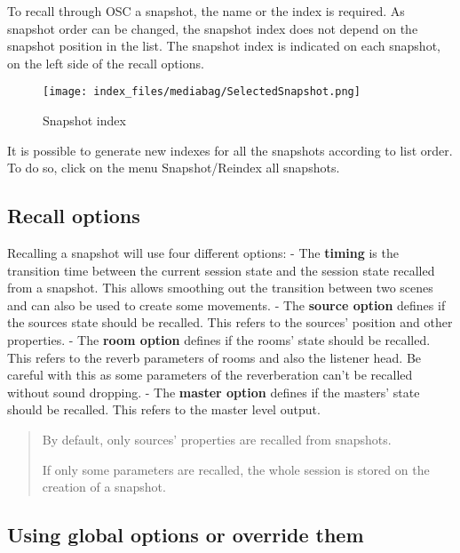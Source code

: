 \documentclass[
  letterpaper,
  DIV=11,
  numbers=noendperiod]{scrreport}
\begin{document}
To recall through OSC a snapshot, the name or the index is required. As
snapshot order can be changed, the snapshot index does not depend on the
snapshot position in the list. The snapshot index is indicated on each
snapshot, on the left side of the recall options.

\begin{figure}

{\centering \texttt{[image: index\_files/mediabag/SelectedSnapshot.png]}

}

\caption{Snapshot index}

\end{figure}

It is possible to generate new indexes for all the snapshots according
to list order. To do so, click on the menu Snapshot/Reindex all
snapshots.

\hypertarget{recall-options}{%
\subsection{Recall options}\label{recall-options}}

Recalling a snapshot will use four different options: - The
\textbf{timing} is the transition time between the current session state
and the session state recalled from a snapshot. This allows smoothing
out the transition between two scenes and can also be used to create
some movements. - The \textbf{source option} defines if the sources
state should be recalled. This refers to the sources' position and other
properties. - The \textbf{room option} defines if the rooms' state
should be recalled. This refers to the reverb parameters of rooms and
also the listener head. Be careful with this as some parameters of the
reverberation can't be recalled without sound dropping. - The
\textbf{master option} defines if the masters' state should be recalled.
This refers to the master level output.

\begin{quote}
By default, only sources' properties are recalled from snapshots.

If only some parameters are recalled, the whole session is stored on the
creation of a snapshot.
\end{quote}

\hypertarget{using-global-options-or-override-them}{%
\subsection{Using global options or override
them}\label{using-global-options-or-override-them}}
\end{document}
